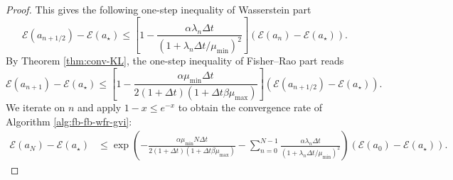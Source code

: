 \documentclass[11pt]{article}
\theoremstyle{plain}
\theoremstyle{definition}
\theoremstyle{remark}
\begin{document}
\begin{proof}
    This gives the following one-step inequality of Wasserstein part
    \begin{equation*}
        \mathcal{E} (a_{n+1/2}) - \mathcal{E} (a_\star) \leq \left[ 1 - \frac{\alpha \lambda_n \Delta t}{(1 + \lambda_n \Delta t / \mu_{\min})^2} \right] (\mathcal{E} (a_n) - \mathcal{E} (a_\star)).
    \end{equation*}
    By Theorem \ref{thm:conv-KL}, the one-step inequality of Fisher--Rao part reads
    \begin{equation*}
        \mathcal{E} (a_{n+1}) - \mathcal{E} (a_\star) \leq \left[ 1 - \frac{\alpha \mu_{\min} \Delta t}{2(1 + \Delta t) (1 + \Delta t \beta \mu_{\max})} \right] (\mathcal{E} (a_{n+1/2}) - \mathcal{E} (a_\star)).
    \end{equation*}
    We iterate on $n$ and apply $1 - x \leq e^{-x}$ to obtain the convergence rate of Algorithm \ref{alg:fb-fb-wfr-gvi}:
    \begin{align*}
        \mathcal{E} (a_N) - \mathcal{E} (a_\star) &\leq \exp \left( - \frac{\alpha \mu_{\min} N \Delta t}{2 (1 + \Delta t) (1 + \Delta t \beta \mu_{\max})} - \sum_{n=0}^{N-1} \frac{\alpha \lambda_n \Delta t}{(1 + \lambda_n \Delta t / \mu_{\min})^2} \right) (\mathcal{E} (a_0) - \mathcal{E} (a_\star)).
    \end{align*}
\end{proof}



\end{document}
